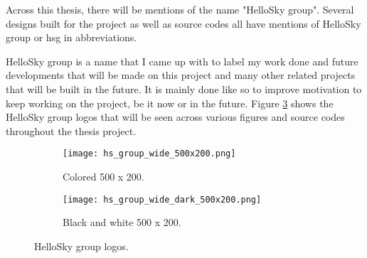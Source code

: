 Across this thesis, there will be mentions of the name "HelloSky group". Several designs built for the project as well as source codes all have mentions of HelloSky group or hsg in abbreviations.

HelloSky group is a name that I came up with to label my work done and future developments that will be made on this project and many other related projects that will be built in the future. It is mainly done like so to improve motivation to keep working on the project, be it now or in the future. Figure \ref{fig:hs-group-logos} shows the HelloSky group logos that will be seen across various figures and source codes throughout the thesis project.

\begin{figure}[!htbp]
    \centering
    \begin{subfigure}{0.4\textwidth}
        \texttt{[image: hs\_group\_wide\_500x200.png]}
        \caption{Colored 500 x 200.}
        \label{fig:hs-group-wide-500x200}
    \end{subfigure}
    \hspace*{\fill}
    \begin{subfigure}{0.4\textwidth}
        \texttt{[image: hs\_group\_wide\_dark\_500x200.png]}
        \caption{Black and white 500 x 200.}
        \label{fig:hs-group-wide-dark-500x200}
    \end{subfigure}
    \caption{HelloSky group logos.}
    \label{fig:hs-group-logos}
\end{figure}



